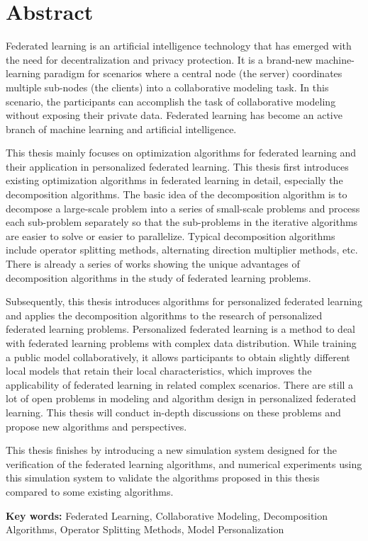 \chapter*{{Abstract}}%
 \headheight=15.24pt%
 \headheight=15.24pt%


Federated learning is an artificial intelligence technology that has emerged with the need for decentralization and privacy protection. It is a brand-new machine-learning paradigm for scenarios where a central node (the server) coordinates multiple sub-nodes (the clients) into a collaborative modeling task. In this scenario, the participants can accomplish the task of collaborative modeling without exposing their private data. Federated learning has become an active branch of machine learning and artificial intelligence.

This thesis mainly focuses on optimization algorithms for federated learning and their application in personalized federated learning. This thesis first introduces existing optimization algorithms in federated learning in detail, especially the decomposition algorithms. The basic idea of the decomposition algorithm is to decompose a large-scale problem into a series of small-scale problems and process each sub-problem separately so that the sub-problems in the iterative algorithms are easier to solve or easier to parallelize. Typical decomposition algorithms include operator splitting methods, alternating direction multiplier methods, etc. There is already a series of works showing the unique advantages of decomposition algorithms in the study of federated learning problems.

Subsequently, this thesis introduces algorithms for personalized federated learning and applies the decomposition algorithms to the research of personalized federated learning problems. Personalized federated learning is a method to deal with federated learning problems with complex data distribution. While training a public model collaboratively, it allows participants to obtain slightly different local models that retain their local characteristics, which improves the applicability of federated learning in related complex scenarios. There are still a lot of open problems in modeling and algorithm design in personalized federated learning. This thesis will conduct in-depth discussions on these problems and propose new algorithms and perspectives.

This thesis finishes by introducing a new simulation system designed for the verification of the federated learning algorithms, and numerical experiments using this simulation system to validate the algorithms proposed in this thesis compared to some existing algorithms.

\par
\bigskip

{\bf Key words:} Federated Learning, Collaborative Modeling, Decomposition Algorithms, Operator Splitting Methods, Model Personalization

